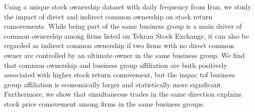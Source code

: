 Using a unique stock ownership dataset with daily frequency from Iran, we study the impact of direct and indirect common ownership on stock return comovements. While being part of the same business group is a main driver of common ownership among firms listed on Tehran Stock Exchange, it can also be regarded as indirect common ownership if two firms with no direct common owner are controlled by an ultimate owner in the same business group. We find that common ownership and business group affiliation are both positively associated with higher stock return comovement, but the impac tof business group affiliation is economically larger and statistically more significant. Furthermore, we show that simultaneous trades in the same direction explains stock price comovement among firms in the same business groups.
